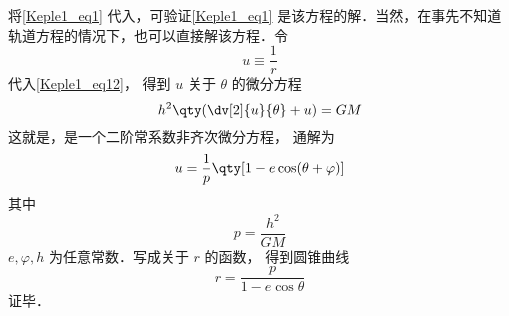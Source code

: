 将\autoref{Keple1_eq1} 代入，可验证\autoref{Keple1_eq1} 是该方程的解．当然，在事先不知道轨道方程的情况下，也可以直接解该方程．令
\begin{equation}\label{Keple1_eq13}
u \equiv \frac{1}{r}
\end{equation}
代入\autoref{Keple1_eq12}，  得到 $u$ 关于 $\theta $ 的微分方程
\begin{equation}\label{Keple1_eq15}
h^2 \qty( \dv[2]{u}{\theta} + u ) =  GM
\end{equation}
这就是，是一个二阶常系数非齐次微分方程， 通解为
\begin{equation}
u = \frac{1}{p} \qty[1 - e\cos(\theta  + \varphi)]
\end{equation}
其中
\begin{equation}
p = \frac{h^2}{GM}
\end{equation}
$e, \varphi, h$ 为任意常数．写成关于 $r$ 的函数， 得到圆锥曲线
\begin{equation}\label{Keple1_eq16}
r = \frac{p}{1 - e \cos \theta }
\end{equation}
证毕．
